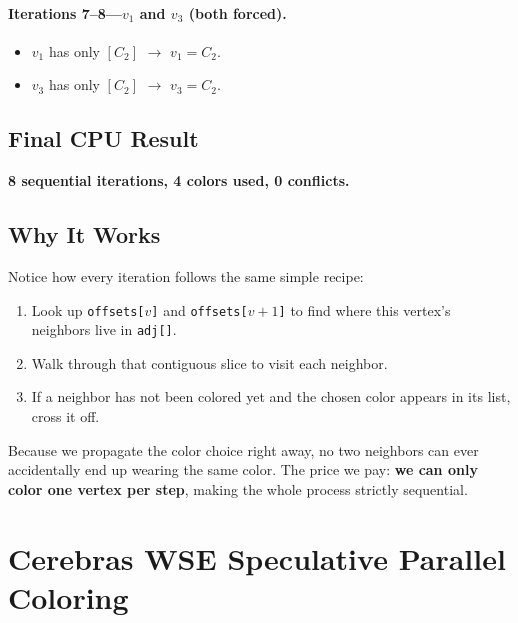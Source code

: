 \documentclass[11pt,letterpaper]{article}
\begin{document}
\paragraph{Iterations 7--8---$v_1$ and $v_3$ (both forced).}
\begin{itemize}[nosep]
  \item $v_1$ has only $[C_2]$ $\rightarrow$ $v_1 = C_2$.
  \item $v_3$ has only $[C_2]$ $\rightarrow$ $v_3 = C_2$.
\end{itemize}

\subsection{Final CPU Result}

\begin{center}
\end{center}

\noindent\textbf{8 sequential iterations, 4 colors used, 0 conflicts.}

\subsection{Why It Works}

Notice how every iteration follows the same simple recipe:
\begin{enumerate}[nosep]
  \item Look up \texttt{offsets[$v$]} and \texttt{offsets[$v{+}1$]} to find where this vertex's neighbors live in \texttt{adj[]}.
  \item Walk through that contiguous slice to visit each neighbor.
  \item If a neighbor has not been colored yet and the chosen color appears in its list, cross it off.
\end{enumerate}

Because we propagate the color choice right away, no two neighbors can ever accidentally end up wearing the same color. The price we pay: \textbf{we can only color one vertex per step}, making the whole process strictly sequential.

\section{Cerebras WSE Speculative Parallel Coloring}
\label{sec:cerebras}
\end{document}
